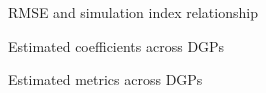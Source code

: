 \documentclass[
  letterpaper,
  DIV=11,
  numbers=noendperiod]{scrartcl}
\numberwithin{equation}{section}
\numberwithin{table}{section}
\numberwithin{figure}{section}
\begin{document}
\begin{landscape}

\begin{table}

\caption{\label{tbl-i_independence}RMSE and simulation index
relationship}

\centering{



}

\end{table}%

\begin{table}[!htbp]

\caption{\label{tbl-coefs_table}Estimated coefficients across DGPs}

\centering{



}

\end{table}%

\begin{table}[!htbp]

\caption{\label{tbl-metrics_table}Estimated metrics across DGPs}

\centering{



}

\end{table}%

\end{landscape}
\end{document}

